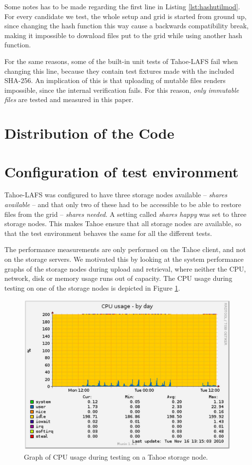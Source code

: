 \documentclass[english,12pt,a4paper]{book}
\begin{document}
Some notes has to be made regarding the first line in Listing
\ref{lst:hashutilmod}. For every candidate we test, the whole setup and grid is
started from ground up, since changing the hash function this way cause a
backwards compatibility break, making it impossible to download files put to the
grid while using another hash function.

For the same reasons, some of the built-in unit tests of Tahoe-LAFS fail when
changing this line, because they contain test fixtures made with the included
SHA-256.  An implication of this is that uploading of mutable files renders
impossible, since the internal verification fails. For this reason, \emph{only
immutable files} are tested and measured in this paper.

\section{Distribution of the Code}

\section{Configuration of test environment}

Tahoe-\ac{LAFS} was configured to have three storage nodes available --
\emph{shares available} -- and that only two of these had to be accessible to be
able to restore files from the grid -- \emph{shares needed}. A setting called
\emph{shares happy} was set to three storage nodes. This makes Tahoe ensure that
all storage nodes are available, so that the test environment behaves the same
for all the different tests.

The performance measurements are only performed on the Tahoe client, and not on
the storage servers. We motivated this by looking at the system performance
graphs of the storage nodes during upload and retrieval, where neither the
\ac{CPU}, network, disk or memory usage runs out of capacity. The \ac{CPU} usage
during testing on one of the storage nodes is depicted in Figure
\ref{fig:munin:storagenode}.

\begin{figure}[h!]
    \centering
    \includegraphics[width=0.8\columnwidth]{munin-tahoe05-cpuday.png}
    \caption{Graph of CPU usage during testing on a Tahoe storage node.}
    \label{fig:munin:storagenode}
\end{figure}
\end{document}
